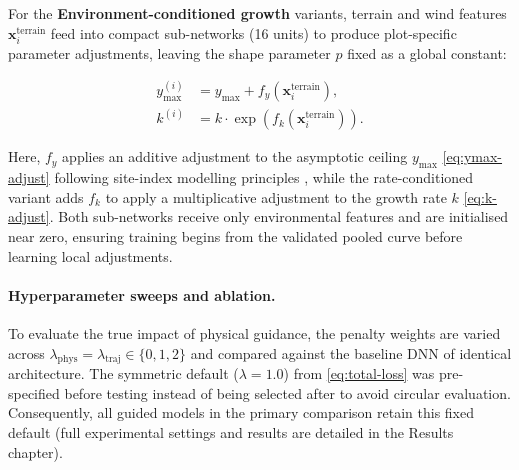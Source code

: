 For the \textbf{Environment-conditioned growth} variants, terrain and wind features $\mathbf{x}^{\text{terrain}}_i$ feed into compact sub-networks (16 units) to produce plot-specific parameter adjustments, leaving the shape parameter $p$ fixed as a global constant:

\begin{subequations}
\label{eq:env-adjustments}
\begin{align}
y_{\max}^{(i)} &= y_{\max} + f_{y}\!\left(\mathbf{x}^{\text{terrain}}_i\right), \label{eq:ymax-adjust} \\
k^{(i)} &= k \cdot \exp\!\left(f_{k}\!\left(\mathbf{x}^{\text{terrain}}_i\right)\right). \label{eq:k-adjust}
\end{align}
\end{subequations}

Here, $f_y$ applies an additive adjustment to the asymptotic ceiling $y_{\max}$ \eqref{eq:ymax-adjust} following site-index modelling principles \citep{socha2023Higher_C1_SS}, while the rate-conditioned variant adds $f_k$ to apply a multiplicative adjustment to the growth rate $k$ \eqref{eq:k-adjust}. Both sub-networks receive only environmental features and are initialised near zero, ensuring training begins from the validated pooled curve before learning local adjustments.

\paragraph*{Hyperparameter sweeps and ablation.} To evaluate the true impact of physical guidance, the penalty weights are varied across $\lambda_{\text{phys}} = \lambda_{\text{traj}} \in \{0, 1, 2\}$ and compared against the baseline DNN of identical architecture. The symmetric default ($\lambda = 1.0$) from \eqref{eq:total-loss} was pre-specified before testing instead of being selected after to avoid circular evaluation. Consequently, all guided models in the primary comparison retain this fixed default (full experimental settings and results are detailed in the Results chapter).



